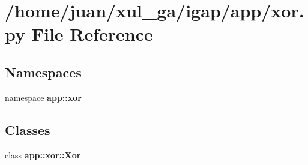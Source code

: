 \section{/home/juan/xul\_\-ga/igap/app/xor.py File Reference}
\label{xor_8py}
\subsection*{Namespaces}
\begin{CompactItemize}
\item 
namespace {\bf app::xor}
\end{CompactItemize}
\subsection*{Classes}
\begin{CompactItemize}
\item 
class {\bf app::xor::Xor}
\end{CompactItemize}
